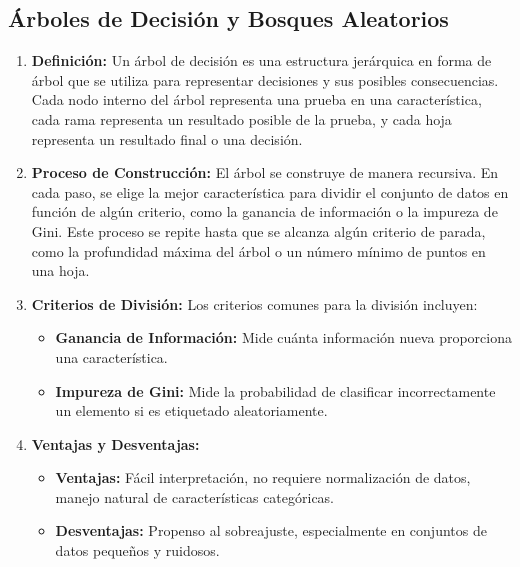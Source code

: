 \documentclass[12pt]{article}
\begin{document}
\subsection{Árboles de Decisión y Bosques Aleatorios}
\begin{enumerate}
    \item \textbf{Definición:}
        Un árbol de decisión es una estructura jerárquica en forma de árbol que se utiliza para representar decisiones y sus posibles consecuencias. Cada nodo interno del árbol representa una prueba en una característica, cada rama representa un resultado posible de la prueba, y cada hoja representa un resultado final o una decisión.

    \item \textbf{Proceso de Construcción:}
        El árbol se construye de manera recursiva. En cada paso, se elige la mejor característica para dividir el conjunto de datos en función de algún criterio, como la ganancia de información o la impureza de Gini. Este proceso se repite hasta que se alcanza algún criterio de parada, como la profundidad máxima del árbol o un número mínimo de puntos en una hoja.

    \item \textbf{Criterios de División:}
        Los criterios comunes para la división incluyen:
        \begin{itemize}
            \item \textbf{Ganancia de Información:} Mide cuánta información nueva proporciona una característica.
            \item \textbf{Impureza de Gini:} Mide la probabilidad de clasificar incorrectamente un elemento si es etiquetado aleatoriamente.
        \end{itemize}

    \item \textbf{Ventajas y Desventajas:}
        \begin{itemize}
            \item \textbf{Ventajas:} Fácil interpretación, no requiere normalización de datos, manejo natural de características categóricas.
            \item \textbf{Desventajas:} Propenso al sobreajuste, especialmente en conjuntos de datos pequeños y ruidosos.
        \end{itemize}
\end{enumerate}
\end{document}
